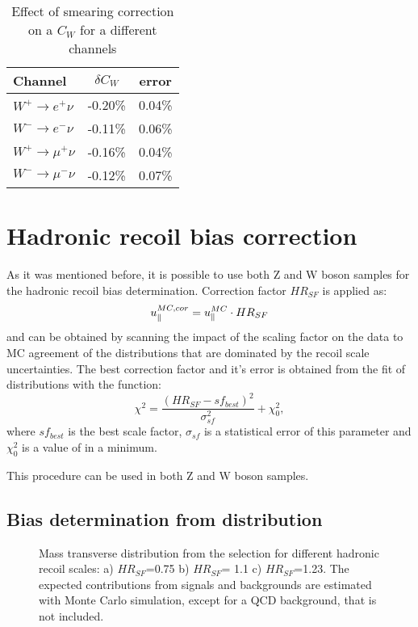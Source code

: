  \begin{table}[!tbp]
 \caption{Effect of smearing correction on a $C_{W}$ for a different channels}
\label{SmearCW}
\begin{center}
\begin{tabular}{| l  | c | c | }
\hline
Channel & $\delta C_W$ & error \\
\hline
\hline
$W^{+} \to e^{+}\nu$ & -0.20\% & 0.04\% \\
$W^{-} \to e^{-}\nu$ & -0.11\% &  0.06\% \\
$W^{+} \to \mu^{+}\nu$ & -0.16\% & 0.04\% \\
$W^{-} \to \mu^{-}\nu$ & -0.12\% & 0.07\% \\
\hline
\end{tabular}
\end{center}

\end{table}

\section{Hadronic recoil bias correction}
As it was mentioned before, it is possible to use both Z and W boson samples for the hadronic recoil bias determination. Correction factor $HR_{SF}$ is applied as:
\begin{equation}
u_{\parallel}^{MC,cor}=u_{\parallel}^{MC} \cdot HR_{SF}
\end{equation}
and can be obtained by scanning the impact of the scaling factor on the data to MC agreement of the distributions that are dominated by the recoil scale uncertainties.  The best correction factor and it's error is obtained from the fit of \chiD distributions with the function:
\begin{equation}\label{eq:chiD}
\chi^2 = \frac{(HR_{SF}-sf_{best})^2}{\sigma_{sf}^2}+\chi^2_0,
\end{equation}
where $sf_{best}$ is the best scale factor,  $\sigma_{sf}$ is a statistical error of this parameter and $\chi^2_0$ is a value of \chiD in a minimum. 

This procedure can be used in both Z and W boson samples.
\subsection{Bias determination from \mtw distribution}
\begin{figure}[!tbp]
\endminipage\hfill
{}
\endminipage\hfill
{}%
\endminipage
\caption{Mass transverse distribution from the \wenu selection for different hadronic recoil scales: a) $HR_{SF}$=0.75 b) $HR_{SF}$= 1.1 c) $HR_{SF}$=1.23. The expected contributions from signals and backgrounds are estimated with Monte Carlo simulation, except for a QCD background, that is not included.}
\label{HadronRecoilScaleMtW}
\end{figure}

